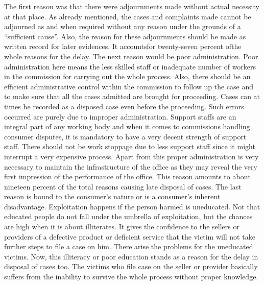 \begin{multicols}{2}
\noi
The first reason was that there were adjournments made without actual necessity at that place.
As already mentioned, the cases and complaints made cannot be adjourned as and when
required without any reason under the grounds of a “sufficient cause”. Also, the reason for
these adjournments should be made as written record for later evidences. It accountsfor twenty-seven percent ofthe whole reasons for the delay. The next reason would be poor administration.
Poor administration here means the less skilled staff or inadequate number of workers in the
commission for carrying out the whole process. Also, there should be an efficient
administrative control within the commission to follow up the case and to make sure that all
the cases admitted are brought for proceeding. Cases can at times be recorded as a disposed
case even before the proceeding. Such errors occurred are purely due to improper
administration. Support staffs are an integral part of any working body and when it comes to
commissions handling consumer disputes, it is mandatory to have a very decent strength of
support staff. There should not be work stoppage due to less support staff since it might
interrupt a very expensive process. Apart from this proper administration is very necessary to
maintain the infrastructure of the office as they may reveal the very first impression of the
performance of the office. This reason amounts to about nineteen percent of the total reasons
causing late disposal of cases. The last reason is bound to the consumer’s nature or is a
consumer’s inherent disadvantage. Exploitation happens if the person harmed is uneducated.
Not that educated people do not fall under the umbrella of exploitation, but the chances are
high when it is about illiterates. It gives the confidence to the sellers or providers of a defective
product or deficient service that the victim will not take further steps to file a case on him.
There arise the problems for the uneducated victims. Now, this illiteracy or poor education
stands as a reason for the delay in disposal of cases too. The victims who file case on the seller
or provider basically suffers from the inability to survive the whole process without proper
knowledge.


\end{multicols}
